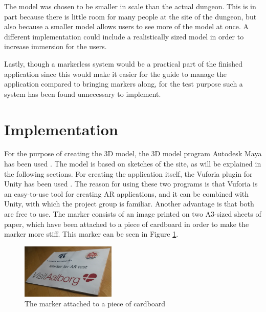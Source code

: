 The model was chosen to be smaller in scale than the actual dungeon. This is in part because there is little room for many people at the site of the dungeon, but also because a smaller model allows users to see more of the model at once. A different implementation could include a realistically sized model in order to increase immersion for the users.

Lastly, though a markerless system would be a practical part of the finished application since this would make it easier for the guide to manage the application compared to bringing markers along, for the test purpose such a system has been found unnecessary to implement.

\section{Implementation}
For the purpose of creating the 3D model, the 3D model program Autodesk Maya has been used \cite{Maya}. The model is based on sketches of the site, as will be explained in the following sections. For creating the application itself, the Vuforia plugin for Unity has been used \cite{Vuforia} \cite{Unity}. The reason for using these two programs is that Vuforia is an easy-to-use tool for creating AR applications, and it can be combined with Unity, with which the project group is familiar. Another advantage is that both are free to use. The marker consists of an image printed on two A3-sized sheets of paper, which have been attached to a piece of cardboard in order to make the marker more stiff. This marker can be seen in Figure \ref{fig:marker_photo}.

\begin{figure}[h!]
    \centering
    \includegraphics[width=0.4\textwidth]{figures/marker_photo.jpg}
	\caption{The marker attached to a piece of cardboard}\label{fig:marker_photo}
\end{figure}

